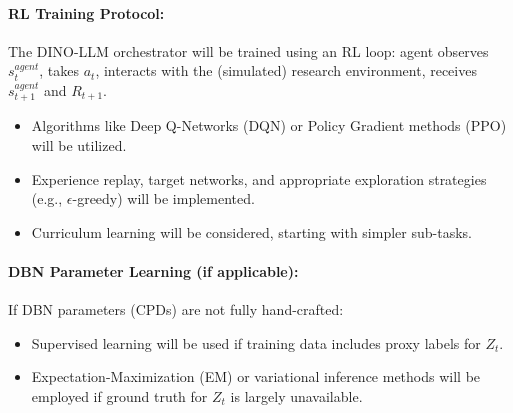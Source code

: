 \documentclass[11pt]{article}
\begin{document}
\paragraph{RL Training Protocol:}
The DINO-LLM orchestrator will be trained using an RL loop: agent observes $s_t^{agent}$, takes $a_t$, interacts with the (simulated) research environment, receives $s_{t+1}^{agent}$ and $R_{t+1}$.
\begin{itemize}
    \item Algorithms like Deep Q-Networks (DQN) or Policy Gradient methods (PPO) will be utilized.
    \item Experience replay, target networks, and appropriate exploration strategies (e.g., $\epsilon$-greedy) will be implemented.
    \item Curriculum learning will be considered, starting with simpler sub-tasks.
\end{itemize}

\paragraph{DBN Parameter Learning (if applicable):}
If DBN parameters (CPDs) are not fully hand-crafted:
\begin{itemize}
    \item Supervised learning will be used if training data includes proxy labels for $Z_t$.
    \item Expectation-Maximization (EM) or variational inference methods will be employed if ground truth for $Z_t$ is largely unavailable.
\end{itemize}
\end{document}
